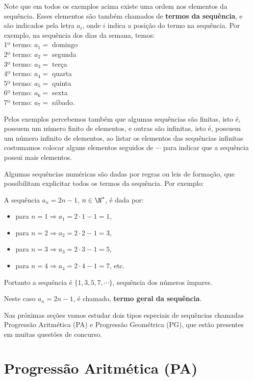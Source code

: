  Note que em todos os exemplos acima existe uma ordem nos elementos da sequência. Esses elementos são também chamados de \textbf{termos da sequência}, e são indicados pela letra $a_i$, onde $i$ indica a posição do termo na sequência. Por exemplo, na sequência dos dias da semana, temos: \\
 1º termo: $a_1=$ domingo\\
 2º termo: $a_2=$ segunda\\
 3º termo: $a_3=$ terça\\
 4º termo: $a_4=$ quarta\\
 5º termo: $a_5=$ quinta\\
 6º termo: $a_6=$ sexta \\
 7º termo: $a_7=$ sábado.

 Pelos exemplos percebemos também que algumas sequências são finitas, isto é, possuem um número finito de elementos, e outras são infinitas, isto é, possuem um número infinito de elementos, ao listar os elementos das sequências infinitas costumamos colocar alguns elementos seguidos de $\cdots$ para indicar que a sequência possui mais elementos.

 Algumas sequências numéricas são dadas por regras ou leis de formação, que possibilitam explicitar todos os termos da sequência. Por exemplo:
 \begin{exem}
  A sequência $a_n= 2n-1$, $n \in \N^{\ast}$, é dada por:
  \begin{itemize}
   \item para $n=1 \Rightarrow a_1=2\cdot 1 - 1= 1$,
   \item para $n=2 \Rightarrow a_2=2\cdot 2 - 1= 3$,
   \item para $n=3 \Rightarrow a_3=2\cdot 3 - 1= 5$,
   \item para $n=4 \Rightarrow a_4=2\cdot 4 - 1= 7$, etc.
  \end{itemize}
 Portanto a sequência é $\{1, 3, 5, 7, \cdots\}$, sequência dos números ímpares.

 Neste caso $a_n= 2n-1$, é chamado, \textbf{termo geral da sequência}.
 \end{exem}

 Nas próximas seções vamos estudar dois tipos especiais de sequências chamadas Progressão Aritmética (PA) e Progressão Geométrica (PG), que estão presentes em muitas questões de concurso.

\section{Progressão Aritmética (PA)}

